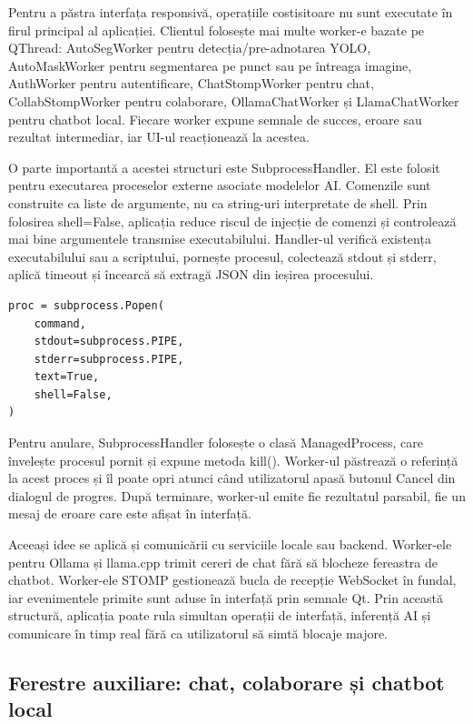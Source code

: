 Pentru a păstra interfața responsivă, operațiile costisitoare nu sunt executate în firul principal al aplicației. Clientul folosește mai multe worker-e bazate pe QThread: AutoSegWorker pentru detecția/pre-adnotarea YOLO, AutoMaskWorker pentru segmentarea pe punct sau pe întreaga imagine, AuthWorker pentru autentificare, ChatStompWorker pentru chat, CollabStompWorker pentru colaborare, OllamaChatWorker și LlamaChatWorker pentru chatbot local. Fiecare worker expune semnale de succes, eroare sau rezultat intermediar, iar UI-ul reacționează la acestea.

O parte importantă a acestei structuri este SubprocessHandler. El este folosit pentru executarea proceselor externe asociate modelelor AI. Comenzile sunt construite ca liste de argumente, nu ca string-uri interpretate de shell. Prin folosirea shell=False, aplicația reduce riscul de injecție de comenzi și controlează mai bine argumentele transmise executabilului. Handler-ul verifică existența executabilului sau a scriptului, pornește procesul, colectează stdout și stderr, aplică timeout și încearcă să extragă JSON din ieșirea procesului.

\begin{verbatim}
proc = subprocess.Popen(
    command,
    stdout=subprocess.PIPE,
    stderr=subprocess.PIPE,
    text=True,
    shell=False,
)
\end{verbatim}

Pentru anulare, SubprocessHandler folosește o clasă ManagedProcess, care învelește procesul pornit și expune metoda kill(). Worker-ul păstrează o referință la acest proces și îl poate opri atunci când utilizatorul apasă butonul Cancel din dialogul de progres. După terminare, worker-ul emite fie rezultatul parsabil, fie un mesaj de eroare care este afișat în interfață.

Aceeași idee se aplică și comunicării cu serviciile locale sau backend. Worker-ele pentru Ollama și llama.cpp trimit cereri de chat fără să blocheze fereastra de chatbot. Worker-ele STOMP gestionează bucla de recepție WebSocket în fundal, iar evenimentele primite sunt aduse în interfață prin semnale Qt. Prin această structură, aplicația poate rula simultan operații de interfață, inferență AI și comunicare în timp real fără ca utilizatorul să simtă blocaje majore.

\subsection{Ferestre auxiliare: chat, colaborare și chatbot local}

